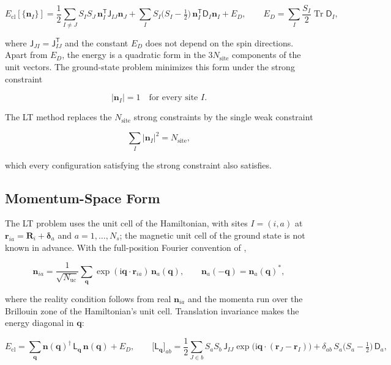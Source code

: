 \[
E_{\mathrm{cl}}[\{\mathbf n_I\}]
=\frac12\sum_{I\neq J}S_IS_J\,\mathbf n_I^{\mathsf T}\mathsf J_{IJ}\mathbf n_J
+\sum_IS_I\big(S_I-\tfrac12\big)\,\mathbf n_I^{\mathsf T}\mathsf D_I\mathbf n_I
+E_D,
\qquad
E_D=\sum_I\frac{S_I}{2}\operatorname{Tr}\mathsf D_I,
\]

where \(\mathsf J_{JI}=\mathsf J_{IJ}^{\mathsf T}\) and the constant \(E_D\) does not depend on the spin directions. Apart from \(E_D\), the energy is a quadratic form in the \(3N_{\mathrm{site}}\) components of the unit vectors. The ground-state problem minimizes this form under the strong constraint

\[
|\mathbf n_I|=1\quad\text{for every site }I.
\]

The LT method replaces the \(N_{\mathrm{site}}\) strong constraints by the single weak constraint

\[
\sum_I|\mathbf n_I|^2=N_{\mathrm{site}},
\]

which every configuration satisfying the strong constraint also satisfies.

\subsection{Momentum-Space Form}

The LT problem uses the unit cell of the Hamiltonian, with sites \(I=(i,a)\) at \(\mathbf r_{ia}=\mathbf R_i+\boldsymbol\delta_a\) and \(a=1,\ldots,N_s\); the magnetic unit cell of the ground state is not known in advance. With the full-position Fourier convention of ,

\[
\mathbf n_{ia}=\frac{1}{\sqrt{N_{\mathrm{uc}}}}\sum_{\mathbf q}\exp(\mathrm i\mathbf q\cdot\mathbf r_{ia})\,\mathbf n_a(\mathbf q),
\qquad
\mathbf n_a(-\mathbf q)=\mathbf n_a(\mathbf q)^*,
\]

where the reality condition follows from real \(\mathbf n_{ia}\) and the momenta run over the Brillouin zone of the Hamiltonian's unit cell. Translation invariance makes the energy diagonal in \(\mathbf q\):

\begin{equation}\label{eq-lswt-lt-matrix}
E_{\mathrm{cl}}=\sum_{\mathbf q}\mathbf n(\mathbf q)^\dagger\,\mathsf L_{\mathbf q}\,\mathbf n(\mathbf q)+E_D,
\qquad
\big[\mathsf L_{\mathbf q}\big]_{ab}
=\frac12\sum_{J\in b}S_aS_b\,\mathsf J_{IJ}\exp\!\big(\mathrm i\mathbf q\cdot(\mathbf r_J-\mathbf r_I)\big)
+\delta_{ab}\,S_a\big(S_a-\tfrac12\big)\,\mathsf D_a,
\end{equation}

